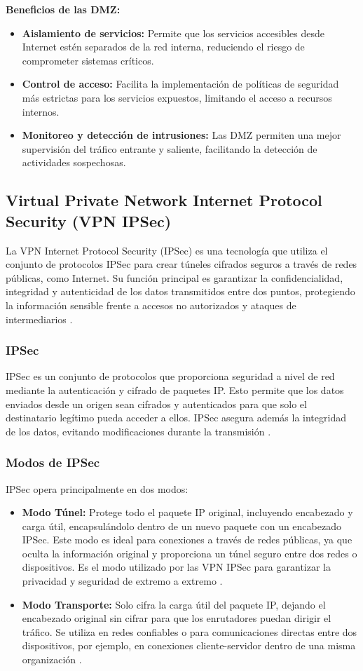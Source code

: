 \textbf{Beneficios de las DMZ:}
\begin{itemize}
    \item \textbf{Aislamiento de servicios:} Permite que los servicios accesibles desde Internet estén separados de la red interna, reduciendo el riesgo de comprometer sistemas críticos.
    \item \textbf{Control de acceso:} Facilita la implementación de políticas de seguridad más estrictas para los servicios expuestos, limitando el acceso a recursos internos.
    \item \textbf{Monitoreo y detección de intrusiones:} Las DMZ permiten una mejor supervisión del tráfico entrante y saliente, facilitando la detección de actividades sospechosas.
\end{itemize}

\subsection{Virtual Private Network Internet Protocol Security (VPN IPSec)}
\label{subsec:ipsec}
La \ac{VPN} Internet Protocol Security (IPSec) es una tecnología que utiliza el conjunto de protocolos IPSec para crear túneles cifrados seguros a través de redes públicas, 
como Internet. Su función principal es garantizar la confidencialidad, integridad y autenticidad de los datos transmitidos entre dos puntos, protegiendo la información 
sensible frente a accesos no autorizados y ataques de intermediarios \cite{ipsec}.

\subsubsection{IPSec}
IPSec es un conjunto de protocolos que proporciona seguridad a nivel de red mediante la autenticación y cifrado de paquetes IP. Esto permite que los datos enviados desde 
un origen sean cifrados y autenticados para que solo el destinatario legítimo pueda acceder a ellos. IPSec asegura además la integridad de los datos, evitando modificaciones 
durante la transmisión \cite{ipsec}.
\subsubsection{Modos de IPSec}
IPSec opera principalmente en dos modos:
\begin{itemize}
    \item \textbf{Modo Túnel:} Protege todo el paquete IP original, incluyendo encabezado y carga útil, encapsulándolo dentro de un nuevo paquete con un encabezado IPSec. 
    Este modo es ideal para conexiones a través de redes públicas, ya que oculta la información original y proporciona un túnel seguro entre dos redes o dispositivos. 
    Es el modo utilizado por las VPN IPSec para garantizar la privacidad y seguridad de extremo a extremo \cite{ipsec}.
    \item \textbf{Modo Transporte:} Solo cifra la carga útil del paquete IP, dejando el encabezado original sin cifrar para que los enrutadores puedan dirigir el tráfico. 
    Se utiliza en redes confiables o para comunicaciones directas entre dos dispositivos, por ejemplo, en conexiones cliente-servidor dentro de una misma organización \cite{ipsec}.
\end{itemize}
